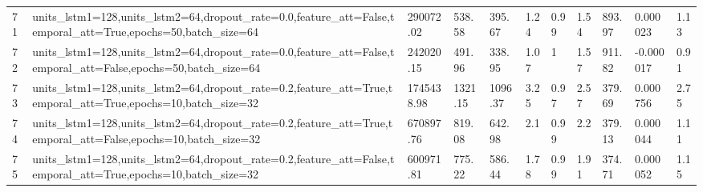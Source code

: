 \begin{longtable}{C{0.8cm} L{2cm} C{1.15cm} C{1.15cm} C{1.15cm} C{1.15cm} C{0.85cm} C{1.25cm} C{1.2cm} C{1.5cm} C{1.0cm}}
71 & units\_lstm1=128,\newline units\_lstm2=64,\newline dropout\_rate=0.0,\newline feature\_att=False,\newline temporal\_att=True,\newline epochs=50,\newline batch\_size=64 & 290072.02 & 538.58 & 395.67 & 1.24 & 0.99 & 1.54 & 893.97 & 0.000023 & 1.13 \\
72 & units\_lstm1=128,\newline units\_lstm2=64,\newline dropout\_rate=0.0,\newline feature\_att=False,\newline temporal\_att=False,\newline epochs=50,\newline batch\_size=64 & 242020.15 & 491.96 & 338.95 & 1.07 & 1 & 1.57 & 911.82 & -0.000017 & 0.91 \\
73 & units\_lstm1=128,\newline units\_lstm2=64,\newline dropout\_rate=0.2,\newline feature\_att=True,\newline temporal\_att=True,\newline epochs=10,\newline batch\_size=32 & 1745438.98 & 1321.15 & 1096.37 & 3.25 & 0.97 & 2.57 & 379.69 & 0.000756 & 2.75 \\
74 & units\_lstm1=128,\newline units\_lstm2=64,\newline dropout\_rate=0.2,\newline feature\_att=True,\newline temporal\_att=False,\newline epochs=10,\newline batch\_size=32 & 670897.76 & 819.08 & 642.98 & 2.1 & 0.99 & 2.2 & 379.13 & 0.000044 & 1.11 \\
75 & units\_lstm1=128,\newline units\_lstm2=64,\newline dropout\_rate=0.2,\newline feature\_att=False,\newline temporal\_att=True,\newline epochs=10,\newline batch\_size=32 & 600971.81 & 775.22 & 586.44 & 1.78 & 0.99 & 1.91 & 374.71 & 0.000052 & 1.15 \\

\end{longtable}
